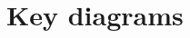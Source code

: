 \documentclass[letterpaper,10pt]{article}
\newtheorem{remark}[theorem]{Remark}
\begin{document}


\section{Key diagrams}\label{sec:key}
\end{document}
